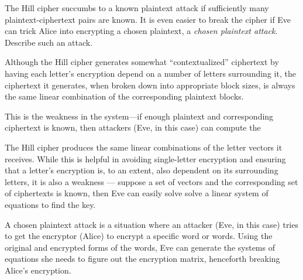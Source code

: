 \begin{problem}
The Hill cipher succumbs to a known plaintext attack if sufficiently
many plaintext-ciphertext pairs are known.
It is even easier to break the cipher if Eve can trick Alice into 
encrypting a chosen plaintext,
a \emph{chosen plaintext attack}.
Describe such an attack.
\end{problem}

\begin{Answer}

Although the Hill cipher generates somewhat ``contextualized'' ciphertext by having
each letter's encryption depend on a number of letters surrounding it,
the ciphertext it generates, when broken down into appropriate block sizes,
is always the same linear combination of the corresponding plaintext blocks.

\noindent
This is the weakness in the system---if enough plaintext and corresponding ciphertext
is known, then attackers (Eve, in this case) can compute the 

The Hill cipher produces the same linear combinations of the letter vectors it receives.
While this is helpful in avoiding single-letter encryption and ensuring that a letter's
encryption is, to an extent, also dependent on its surrounding letters,
it is also a weakness --- suppose a set of vectors and the corresponding set of ciphertexts
is known, then Eve can easily solve solve a linear system of equations to find the key.


\noindent
A chosen plaintext attack is a situation where an attacker (Eve, in this case)
tries to get the encryptor (Alice) to encrypt a specific word or words.
Using the original and encrypted forms of the words, Eve can generate the systems of equations
she needs to figure out the encryption matrix, henceforth breaking Alice's encryption.
\end{Answer}
